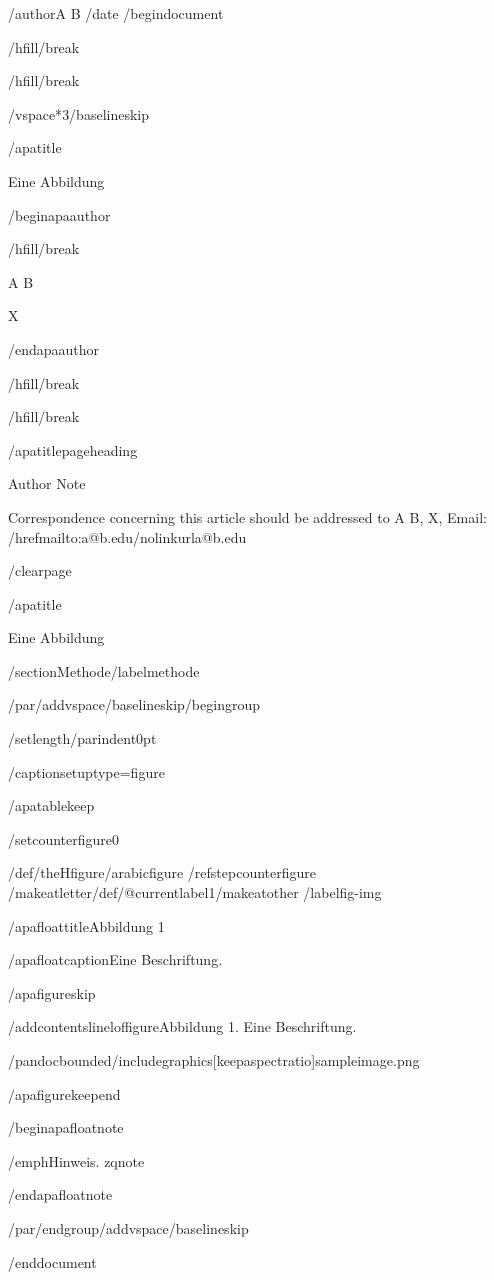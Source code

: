 /author{A B}
/date{}
/begin{document}


/hfill/break

/hfill/break

/vspace*{3/baselineskip}

/apatitle{

Eine Abbildung

}

/begin{apaauthor}

/hfill/break

A B

X

/end{apaauthor}

/hfill/break

/hfill/break

/apatitlepageheading{

Author Note

}

Correspondence concerning this article should be addressed to A
B, X, Email: /href{mailto:a@b.edu}{/nolinkurl{a@b.edu}}

/clearpage

/apatitle{

Eine Abbildung

}

/section{Methode}/label{methode}

/par/addvspace{/baselineskip}/begingroup

/setlength{/parindent}{0pt}

/captionsetup{type=figure}

/apatablekeep

/setcounter{figure}{0}

/def/theHfigure{/arabic{figure}}%
/refstepcounter{figure}%
/makeatletter/def/@currentlabel{1}/makeatother%
/label{fig-img}

/apafloattitle{Abbildung 1}

/apafloatcaption{Eine Beschriftung.}

/apafigureskip

/addcontentsline{lof}{figure}{Abbildung 1. Eine Beschriftung.}

/pandocbounded{/includegraphics[keepaspectratio]{sampleimage.png}}

/apafigurekeepend

/begin{apafloatnote}

/emph{Hinweis}. zqnote

/end{apafloatnote}

/par/endgroup/addvspace{/baselineskip}




/end{document}
